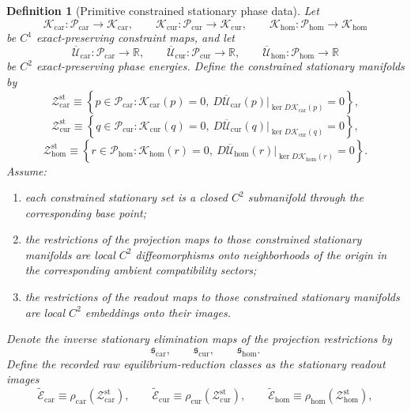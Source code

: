 \documentclass[11pt]{article}
\newcommand{\TensorRawEqClass}{\widetilde{\mathscr E}_{\mathrm{car}}}
\newcommand{\CurRawEqClass}{\widetilde{\mathscr E}_{\mathrm{cur}}}
\newcommand{\HomRawEqClass}{\widetilde{\mathscr E}_{\mathrm{hom}}}
\newcommand{\TensorPhaseClass}{\mathscr P_{\mathrm{car}}}
\newcommand{\CurPhaseClass}{\mathscr P_{\mathrm{cur}}}
\newcommand{\HomPhaseClass}{\mathscr P_{\mathrm{hom}}}
\newcommand{\TensorPhaseRead}{\rho_{\mathrm{car}}}
\newcommand{\CurPhaseRead}{\rho_{\mathrm{cur}}}
\newcommand{\HomPhaseRead}{\rho_{\mathrm{hom}}}
\newcommand{\TensorConstraint}{\mathcal K_{\mathrm{car}}}
\newcommand{\CurConstraint}{\mathcal K_{\mathrm{cur}}}
\newcommand{\HomConstraint}{\mathcal K_{\mathrm{hom}}}
\newcommand{\TensorPhaseEnergy}{\overline{\mathcal U}_{\mathrm{car}}}
\newcommand{\CurPhaseEnergy}{\overline{\mathcal U}_{\mathrm{cur}}}
\newcommand{\HomPhaseEnergy}{\overline{\mathcal U}_{\mathrm{hom}}}
\newcommand{\TensorStationaryManifold}{\mathcal Z_{\mathrm{car}}^{\mathrm{st}}}
\newcommand{\CurStationaryManifold}{\mathcal Z_{\mathrm{cur}}^{\mathrm{st}}}
\newcommand{\HomStationaryManifold}{\mathcal Z_{\mathrm{hom}}^{\mathrm{st}}}
\newcommand{\TensorStationarySolve}{\mathfrak s_{\mathrm{car}}}
\newcommand{\CurStationarySolve}{\mathfrak s_{\mathrm{cur}}}
\newcommand{\HomStationarySolve}{\mathfrak s_{\mathrm{hom}}}
\newtheorem{definition}{Definition}
\begin{document}
\begin{definition}[Primitive constrained stationary phase data]
Let
\[
\TensorConstraint:\TensorPhaseClass\to\mathscr K_{\mathrm{car}},\qquad
\CurConstraint:\CurPhaseClass\to\mathscr K_{\mathrm{cur}},\qquad
\HomConstraint:\HomPhaseClass\to\mathscr K_{\mathrm{hom}}
\]
be \(C^1\) exact-preserving constraint maps, and let
\[
\TensorPhaseEnergy:\TensorPhaseClass\to\mathbb R,\qquad
\CurPhaseEnergy:\CurPhaseClass\to\mathbb R,\qquad
\HomPhaseEnergy:\HomPhaseClass\to\mathbb R
\]
be \(C^2\) exact-preserving phase energies. Define the constrained stationary manifolds by
\begin{equation}
\TensorStationaryManifold
\equiv
\left\{
p\in\TensorPhaseClass:
\TensorConstraint(p)=0,\
D\TensorPhaseEnergy(p)\big|_{\ker D\TensorConstraint(p)}=0
\right\},
\label{eq:stationary_manifold_car}
\end{equation}
\begin{equation}
\CurStationaryManifold
\equiv
\left\{
q\in\CurPhaseClass:
\CurConstraint(q)=0,\
D\CurPhaseEnergy(q)\big|_{\ker D\CurConstraint(q)}=0
\right\},
\label{eq:stationary_manifold_cur}
\end{equation}
\begin{equation}
\HomStationaryManifold
\equiv
\left\{
r\in\HomPhaseClass:
\HomConstraint(r)=0,\
D\HomPhaseEnergy(r)\big|_{\ker D\HomConstraint(r)}=0
\right\}.
\label{eq:stationary_manifold_hom}
\end{equation}
Assume:
\begin{enumerate}
    \item each constrained stationary set is a closed \(C^2\) submanifold through the corresponding base point;
    \item the restrictions of the projection maps to those constrained stationary manifolds are local \(C^2\) diffeomorphisms onto neighborhoods of the origin in the corresponding ambient compatibility sectors;
    \item the restrictions of the readout maps to those constrained stationary manifolds are local \(C^2\) embeddings onto their images.
\end{enumerate}
Denote the inverse stationary elimination maps of the projection restrictions by
\[
\TensorStationarySolve,\qquad
\CurStationarySolve,\qquad
\HomStationarySolve.
\]
Define the recorded raw equilibrium-reduction classes as the stationary readout images
\begin{equation}
\TensorRawEqClass\equiv\TensorPhaseRead(\TensorStationaryManifold),\qquad
\CurRawEqClass\equiv\CurPhaseRead(\CurStationaryManifold),\qquad
\HomRawEqClass\equiv\HomPhaseRead(\HomStationaryManifold),
\label{eq:raw_eq_class_from_phase}

\end{equation}
\end{definition}
\end{document}
